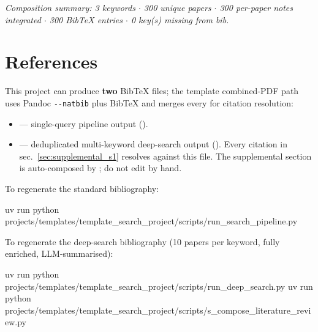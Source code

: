 \documentclass[
]{article}
\newenvironment{Shaded}{}{}
\newcommand{\ExtensionTok}[1]{#1}
\newcommand{\NormalTok}[1]{#1}
\providecommand{\tightlist}{%
  \setlength{\itemsep}{0pt}\setlength{\parskip}{0pt}}
\begin{document}
\emph{Composition summary: 3 keywords \texorpdfstring{\ensuremath{\cdot}}{.} 300 unique papers \texorpdfstring{\ensuremath{\cdot}}{.} 300
per-paper notes integrated \texorpdfstring{\ensuremath{\cdot}}{.} 300 BibTeX entries \texorpdfstring{\ensuremath{\cdot}}{.} 0 key(s) missing from
bib.}

\newpage

\section{References}\label{sec:references}

This project can produce \textbf{two} BibTeX files; the template
combined-PDF path uses Pandoc \texttt{-\/-natbib} plus BibTeX and merges
every  for citation resolution:

\begin{itemize}
\tightlist
\item
  \href{references.bib}{} ---
  single-query pipeline output
  ().
\item
  \href{references_deep.bib}{}
  --- deduplicated multi-keyword deep-search output
  (). Every citation in
  sec.~\ref{sec:supplemental_s1} resolves against this file. The
  supplemental section is auto-composed by
  ; do not edit by
  hand.
\end{itemize}

To regenerate the standard bibliography:

\begin{Shaded}
\begin{Highlighting}[]
\ExtensionTok{uv}\NormalTok{ run python projects/templates/template\_search\_project/scripts/run\_search\_pipeline.py}
\end{Highlighting}
\end{Shaded}

To regenerate the deep-search bibliography (10 papers per keyword, fully
enriched, LLM-summarised):

\begin{Shaded}
\begin{Highlighting}[]
\ExtensionTok{uv}\NormalTok{ run python projects/templates/template\_search\_project/scripts/run\_deep\_search.py}
\ExtensionTok{uv}\NormalTok{ run python projects/templates/template\_search\_project/scripts/s\_compose\_literature\_review.py}
\end{Highlighting}
\end{Shaded}
\end{document}
